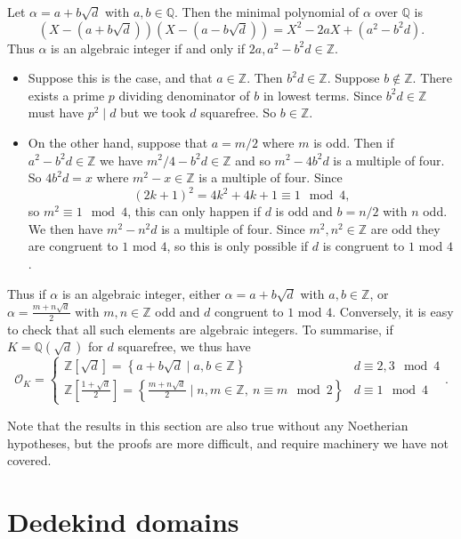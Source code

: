 \documentclass{article}
\newcommand{\Z}{\mathbb{Z}}
\newcommand{\Q}{\mathbb{Q}}
\newcommand{\rb}[1]{\left( #1 \right)}
\renewcommand{\sb}[1]{\left[ #1 \right]}
\newcommand{\cb}[1]{\left\{ #1 \right\}}
\theoremstyle{definition}\newtheorem{definition}{Definition}[subsection]
\theoremstyle{definition}\newtheorem{remark}[definition]{Remark}
\theoremstyle{definition}\newtheorem*{example}{Example}
\theoremstyle{definition}\newtheorem*{note}{Note}
\begin{document}
Let $ \alpha = a + b\sqrt{d} $ with $ a, b \in \Q $. Then the minimal polynomial of $ \alpha $ over $ \Q $ is
$$ \rb{X - \rb{a + b\sqrt{d}}}\rb{X - \rb{a - b\sqrt{d}}} = X^2 - 2aX + \rb{a^2 - b^2d}. $$
Thus $ \alpha $ is an algebraic integer if and only if $ 2a, a^2 - b^2d \in \Z $.
\begin{itemize}
\item Suppose this is the case, and that $ a \in \Z $. Then $ b^2d \in \Z $. Suppose $ b \notin \Z $. There exists a prime $ p $ dividing denominator of $ b $ in lowest terms. Since $ b^2d \in \Z $ must have $ p^2 \mid d $ but we took $ d $ squarefree. So $ b \in \Z $.
\item On the other hand, suppose that $ a = m / 2 $ where $ m $ is odd. Then if $ a^2 - b^2d \in \Z $ we have $ m^2 / 4 - b^2d \in \Z $ and so $ m^2 - 4b^2d $ is a multiple of four. So $ 4b^2d = x $ where $ m^2 - x \in \Z $ is a multiple of four. Since
$$ \rb{2k + 1}^2 = 4k^2 + 4k + 1 \equiv 1 \mod 4, $$
so $ m^2 \equiv 1 \mod 4 $, this can only happen if $ d $ is odd and $ b = n / 2 $ with $ n $ odd. We then have $ m^2 - n^2d $ is a multiple of four. Since $ m^2, n^2 \in \Z $ are odd they are congruent to $ 1 $ mod $ 4 $, so this is only possible if $ d $ is congruent to $ 1 $ mod $ 4 $.
\end{itemize}
Thus if $ \alpha $ is an algebraic integer, either $ \alpha = a + b\sqrt{d} $ with $ a, b \in \Z $, or $ \alpha = \tfrac{m + n\sqrt{d}}{2} $ with $ m, n \in \Z $ odd and $ d $ congruent to $ 1 $ mod $ 4 $. Conversely, it is easy to check that all such elements are algebraic integers. To summarise, if $ K = \Q\rb{\sqrt{d}} $ for $ d $ squarefree, we thus have
$$ \mathcal{O}_K = \begin{cases}
\Z\sb{\sqrt{d}} = \cb{a + b\sqrt{d} \mid a, b \in \Z} & d \equiv 2, 3 \mod 4 \\
\Z\sb{\tfrac{1 + \sqrt{d}}{2}} = \cb{\tfrac{m + n\sqrt{d}}{2} \mid n, m \in \Z, \ n \equiv m \mod 2} & d \equiv 1 \mod 4
\end{cases}. $$

Note that the results in this section are also true without any Noetherian hypotheses, but the proofs are more difficult, and require machinery we have not covered.

\pagebreak


\section{Dedekind domains}
\end{document}
